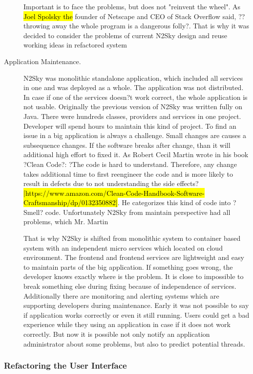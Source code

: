 \begin{description}
Important is to face the problems, but does not "reinvent the wheel".  As \hl{Joel Spolsky the} founder of Netscape and CEO of Stack Overflow said, ??throwing away the whole program is a dangerous folly?. That is why it was decided to consider the problems of current N2Sky design and reuse working ideas in refactored system

\item[Application Maintenance.]
N2Sky was monolithic standalone application, which included all services in one and was deployed as a whole. The application was not distributed.  In case if one of the services doesn?t work correct, the whole application is not usable. 
Originally the previous version of N2Sky was written fully on Java. There were hundreds classes, providers and services in one project. Developer will spend hours to maintain this kind of project. To find an issue in a big application is always a challenge.  Small changes are causes a subsequence changes. If the software breaks after change, than it will additional high effort to fixed it. As Robert Cecil Martin wrote in his book ?Clean Code?: ?The code is hard to understand. Therefore, any change takes additional time to first reengineer the code and is more likely to result in defects due to not understanding the side effects? \hl{[https://www.amazon.com/Clean-Code-Handbook-Software-Craftsmanship/dp/0132350882]}.  He categorizes this kind of code into ?Smell? code. Unfortunately N2Sky from maintain perspective had all problems, which Mr. Martin

That is why N2Sky is shifted from monolithic system to container based system with an independent micro services which located on cloud environment. 
The frontend and frontend services are lightweight and easy to maintain parts of the big application. If something goes wrong, the developer knows exactly where is the problem. It is close to impossible to break something else during fixing because of independence of services. 
Additionally there are monitoring and alerting systems which are supporting developers during maintenance.  Early it was not possible to say if application works correctly or even it still running. Users could get a bad experience while they using an application in case if it does not work correctly. But now it is possible not only notify an application administrator about some problems, but also to predict potential threads. 
\end{description}


\subsubsection{Refactoring the User Interface}\label{Refactoring the User Interface}

